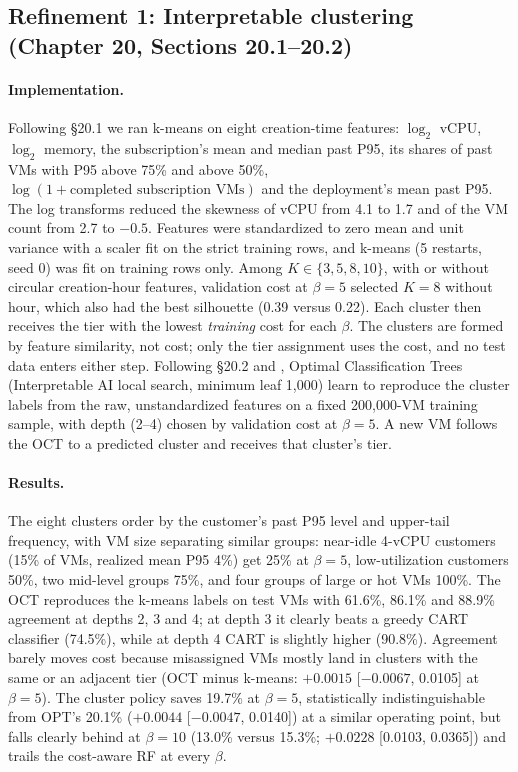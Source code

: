 \documentclass[10pt]{article}
\begin{document}
\subsection{Refinement 1: Interpretable clustering (Chapter 20, Sections 20.1--20.2)}

\paragraph{Implementation.} Following \S20.1 we ran k-means \citep{lloyd1982kmeans} on eight creation-time features: $\log_2$ vCPU, $\log_2$ memory, the subscription's mean and median past P95, its shares of past VMs with P95 above 75\% and above 50\%, $\log(1+\text{completed subscription VMs})$ and the deployment's mean past P95. The log transforms reduced the skewness of vCPU from 4.1 to 1.7 and of the VM count from 2.7 to $-0.5$. Features were standardized to zero mean and unit variance with a scaler fit on the strict training rows, and k-means (5 restarts, seed 0) was fit on training rows only. Among $K\in\{3,5,8,10\}$, with or without circular creation-hour features, validation cost at $\beta=5$ selected $K=8$ without hour, which also had the best silhouette (0.39 versus 0.22). Each cluster then receives the tier with the lowest \emph{training} cost for each $\beta$. The clusters are formed by feature similarity, not cost; only the tier assignment uses the cost, and no test data enters either step. Following \S20.2 and \citet{bertsimas2017oct,bertsimas2021clustering}, Optimal Classification Trees (Interpretable AI local search, minimum leaf 1,000) learn to reproduce the cluster labels from the raw, unstandardized features on a fixed 200,000-VM training sample, with depth (2--4) chosen by validation cost at $\beta=5$. A new VM follows the OCT to a predicted cluster and receives that cluster's tier.

\paragraph{Results.} The eight clusters order by the customer's past P95 level and upper-tail frequency, with VM size separating similar groups: near-idle 4-vCPU customers (15\% of VMs, realized mean P95 4\%) get 25\% at $\beta=5$, low-utilization customers 50\%, two mid-level groups 75\%, and four groups of large or hot VMs 100\%. The OCT reproduces the k-means labels on test VMs with 61.6\%, 86.1\% and 88.9\% agreement at depths 2, 3 and 4; at depth 3 it clearly beats a greedy CART classifier (74.5\%), while at depth 4 CART is slightly higher (90.8\%). Agreement barely moves cost because misassigned VMs mostly land in clusters with the same or an adjacent tier (OCT minus k-means: $+0.0015$ [$-0.0067$, 0.0105] at $\beta=5$). The cluster policy saves 19.7\% at $\beta=5$, statistically indistinguishable from OPT's 20.1\% ($+0.0044$ [$-0.0047$, 0.0140]) at a similar operating point, but falls clearly behind at $\beta=10$ (13.0\% versus 15.3\%; $+0.0228$ [0.0103, 0.0365]) and trails the cost-aware RF at every $\beta$.
\end{document}
